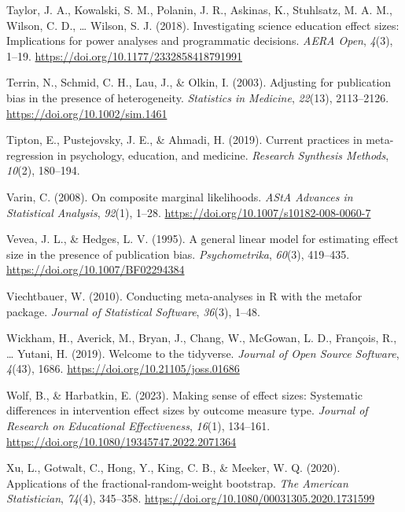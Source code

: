 \documentclass[
  american,
  man, donotrepeattitle,floatsintext]{apa7}
\newlength{\cslhangindent}
\newenvironment{CSLReferences}[2] %
 {\begin{list}{}{%
  \setlength{\itemindent}{0pt}
  \setlength{\leftmargin}{0pt}
  \setlength{\parsep}{0pt}
  \ifodd #1
   \setlength{\leftmargin}{\cslhangindent}
   \setlength{\itemindent}{-1\cslhangindent}
  \fi
  \setlength{\itemsep}{#2\baselineskip}}}
 {\end{list}}
\begin{document}
\begin{CSLReferences}{1}{0}
Taylor, J. A., Kowalski, S. M., Polanin, J. R., Askinas, K., Stuhlsatz, M. A. M., Wilson, C. D., \ldots{} Wilson, S. J. (2018). Investigating science education effect sizes: Implications for power analyses and programmatic decisions. \emph{AERA Open}, \emph{4}(3), 1--19. \url{https://doi.org/10.1177/2332858418791991}

Terrin, N., Schmid, C. H., Lau, J., \& Olkin, I. (2003). Adjusting for publication bias in the presence of heterogeneity. \emph{Statistics in Medicine}, \emph{22}(13), 2113--2126. \url{https://doi.org/10.1002/sim.1461}

Tipton, E., Pustejovsky, J. E., \& Ahmadi, H. (2019). Current practices in meta-regression in psychology, education, and medicine. \emph{Research Synthesis Methods}, \emph{10}(2), 180--194.

Varin, C. (2008). On composite marginal likelihoods. \emph{AStA Advances in Statistical Analysis}, \emph{92}(1), 1--28. \url{https://doi.org/10.1007/s10182-008-0060-7}

Vevea, J. L., \& Hedges, L. V. (1995). A general linear model for estimating effect size in the presence of publication bias. \emph{Psychometrika}, \emph{60}(3), 419--435. \url{https://doi.org/10.1007/BF02294384}

Viechtbauer, W. (2010). {Conducting meta-analyses in R with the metafor package}. \emph{Journal of Statistical Software}, \emph{36}(3), 1--48.

Wickham, H., Averick, M., Bryan, J., Chang, W., McGowan, L. D., François, R., \ldots{} Yutani, H. (2019). Welcome to the {tidyverse}. \emph{Journal of Open Source Software}, \emph{4}(43), 1686. \url{https://doi.org/10.21105/joss.01686}

Wolf, B., \& Harbatkin, E. (2023). Making sense of effect sizes: Systematic differences in intervention effect sizes by outcome measure type. \emph{Journal of Research on Educational Effectiveness}, \emph{16}(1), 134--161. \url{https://doi.org/10.1080/19345747.2022.2071364}

Xu, L., Gotwalt, C., Hong, Y., King, C. B., \& Meeker, W. Q. (2020). Applications of the fractional-random-weight bootstrap. \emph{The American Statistician}, \emph{74}(4), 345--358. \url{https://doi.org/10.1080/00031305.2020.1731599}

\end{CSLReferences}
\end{document}
